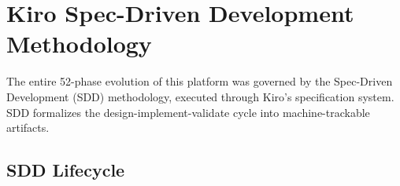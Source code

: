 \documentclass[11pt,letterpaper]{article}
\begin{document}
\section{Kiro Spec-Driven Development Methodology}
\label{sec:kiro}

The entire 52-phase evolution of this platform was governed by the
Spec-Driven Development (SDD) methodology, executed through Kiro's
specification system. SDD formalizes the design-implement-validate cycle
into machine-trackable artifacts.

\subsection{SDD Lifecycle}
\end{document}
